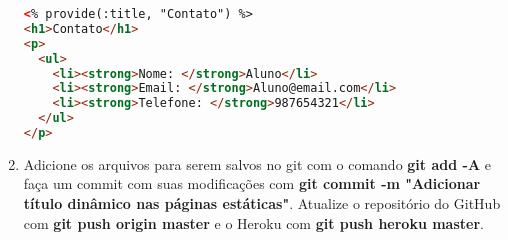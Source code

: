 \documentclass[a4paper,12pt]{article}
\begin{document}
\begin{enumerate}
    \begin{lstlisting}[language=html, title=app/views/paginas\_estaticas/contato.html.erb]
<% provide(:title, "Contato") %>
<h1>Contato</h1>
<p>
  <ul>
    <li><strong>Nome: </strong>Aluno</li>
    <li><strong>Email: </strong>Aluno@email.com</li>
    <li><strong>Telefone: </strong>987654321</li>
  </ul>
</p>
  \end{lstlisting}

  \item Adicione os arquivos para serem salvos no git com o comando \textbf{git add -A} e faça um commit com suas modificações com \textbf{git commit -m "Adicionar título dinâmico nas páginas estáticas"}. Atualize o repositório do GitHub com \textbf{git push origin master} e o Heroku com \textbf{git push heroku master}.

\end{enumerate}
\end{document}
